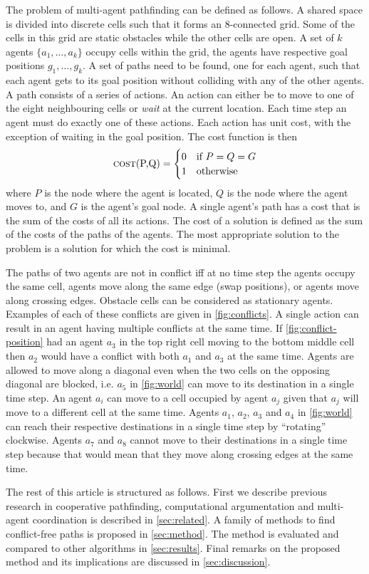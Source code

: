 The problem of multi-agent pathfinding can be defined as follows. A shared
space is divided into discrete cells such that it forms an 8-connected grid.
Some of the cells in this grid are static obstacles while the other cells are
open. A set of $k$ agents $\{a_1, \ldots, a_k\}$ occupy cells within the grid,
the agents have respective goal positions $g_1, \ldots, g_k$. A set of paths
need to be found, one for each agent, such that each agent gets to its goal
position without colliding with any of the other agents. A path consists of a
series of actions. An action can either be to move to one of the eight
neighbouring cells or \emph{wait} at the current location. Each time step an
agent must do exactly one of these actions. Each action has unit cost, with the
exception of waiting in the goal position. The cost function is then
\[
\text{\textsc{cost}(P,Q)} =
\begin{cases}
0 & \text{if } P = Q = G \\
1 & \text{otherwise}
\end{cases}
\]
where $P$ is the node where the agent is located, $Q$ is the node where the
agent moves to, and $G$ is the agent's goal node. A single agent's path has a
cost that is the sum of the costs of all its actions. The cost of a solution is
defined as the sum of the costs of the paths of the agents. The most
appropriate solution to the problem is a solution for which the cost is minimal.

The paths of two agents are not in conflict iff at no time step the agents
occupy the same cell, agents move along the same edge (swap positions), or
agents move along crossing edges. Obstacle cells can be considered as
stationary agents. Examples of each of these conflicts are given in
\autoref{fig:conflicts}. A single action can result in an agent having multiple
conflicts at the same time. If \autoref{fig:conflict-position} had an agent
$a_3$ in the top right cell moving to the bottom middle cell then $a_2$ would
have a conflict with both $a_1$ and $a_3$ at the same time. Agents are allowed
to move along a diagonal even when the two cells on the opposing diagonal are
blocked, i.e. $a_5$ in \autoref{fig:world} can move to its destination in a
single time step. An agent $a_i$ can move to a cell occupied by agent $a_j$
given that $a_j$ will move to a different cell at the same time. Agents $a_1$,
$a_2$, $a_3$ and $a_4$ in \autoref{fig:world} can reach their respective
destinations in a single time step by ``rotating'' clockwise. Agents $a_7$ and
$a_8$ cannot move to their destinations in a single time step because that
would mean that they move along crossing edges at the same time.

The rest of this article is structured as follows.
First we describe previous research in cooperative pathfinding, computational 
argumentation and multi-agent coordination is described in 
\autoref{sec:related}.
A family of methods to find
conflict-free paths is proposed in \autoref{sec:method}. The method is
evaluated and compared to other algorithms in \autoref{sec:results}. Final
remarks on the proposed method and its implications are discussed in
\autoref{sec:discussion}.
